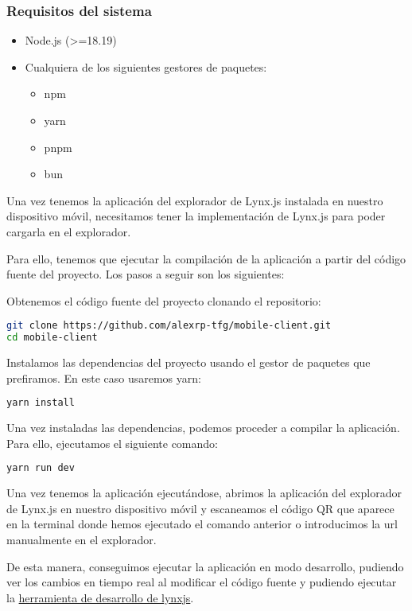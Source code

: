 \subsubsection{Requisitos del sistema}
\begin{itemize}
    \item Node.js (>=18.19)
    \item Cualquiera de los siguientes gestores de paquetes:
        \begin{itemize}
            \item npm
            \item yarn
            \item pnpm
            \item bun
        \end{itemize}
\end{itemize}
Una vez tenemos la aplicación del explorador de Lynx.js instalada en nuestro dispositivo móvil, necesitamos tener la implementación de Lynx.js para poder cargarla en el explorador.

Para ello, tenemos que ejecutar la compilación de la aplicación a partir del código fuente del proyecto. Los pasos a seguir son los siguientes:

Obtenemos el código fuente del proyecto clonando el repositorio:
\begin{lstlisting}[language=bash]
git clone https://github.com/alexrp-tfg/mobile-client.git
cd mobile-client
\end{lstlisting}

Instalamos las dependencias del proyecto usando el gestor de paquetes que prefiramos. En este caso usaremos yarn:
\begin{lstlisting}[language=bash]
yarn install
\end{lstlisting}

Una vez instaladas las dependencias, podemos proceder a compilar la aplicación. Para ello, ejecutamos el siguiente comando:
\begin{lstlisting}[language=bash]
yarn run dev
\end{lstlisting}

Una vez tenemos la aplicación ejecutándose, abrimos la aplicación del explorador de Lynx.js en nuestro dispositivo móvil y escaneamos el código QR que aparece en la terminal donde hemos ejecutado el comando anterior o introducimos la url manualmente en el explorador.

De esta manera, conseguimos ejecutar la aplicación en modo desarrollo, pudiendo ver los cambios en tiempo real al modificar el código fuente y pudiendo ejecutar la \href{github.com/lynx-family/lynx-devtool}{herramienta de desarrollo de lynxjs}.
